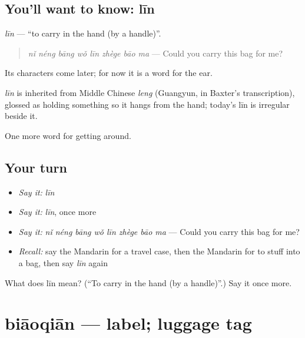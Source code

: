 \subsection*{You'll want to know: līn}
\emph{līn} — \textquotedblleft{}to carry in the hand (by a handle)\textquotedblright{}.

\begin{quote}
\emph{nǐ néng bāng wǒ līn zhège bāo ma} — Could you carry this bag for me?
\end{quote}

Its characters come later; for now it is a word for the ear.

\begin{cousinweb}
\emph{līn} is inherited from Middle Chinese \emph{leng} (Guangyun, in Baxter's transcription), glossed as holding something so it hangs from the hand; today's līn is irregular beside it.
\end{cousinweb}

\begin{grammarlens}[title={What you've built}]
One more word for getting around.
\end{grammarlens}

\subsection*{Your turn}
\begin{itemize}
\raggedright
  \item \emph{Say it:} \emph{līn}
  \item \emph{Say it:} \emph{līn}, once more
  \item \emph{Say it:} \emph{nǐ néng bāng wǒ līn zhège bāo ma} — Could you carry this bag for me?
  \item \emph{Recall:} say the Mandarin for a travel case, then the Mandarin for to stuff into a bag, then say \emph{līn} again
\end{itemize}

\begin{tcolorbox}[breakable,colback=teal!4,colframe=teal!35!black,title={Before you move on}]
What does līn mean? (\textquotedblleft{}To carry in the hand (by a handle)\textquotedblright{}.) Say it once more.
\end{tcolorbox}
\section[biāoqiān]{biāoqiān — label; luggage tag}

\label{lesson:ZH-C453-biaoqian}



